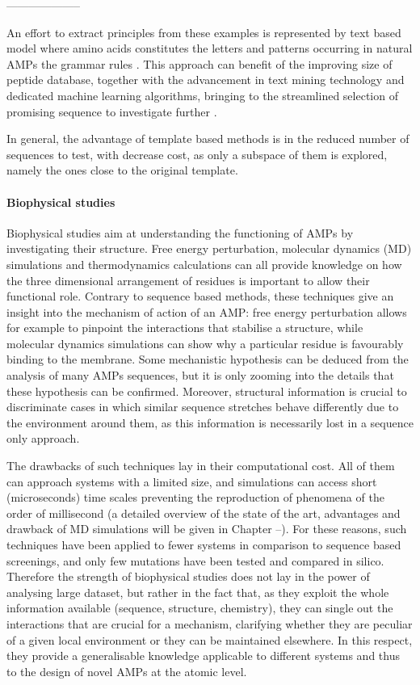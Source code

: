 --------------------




An effort to extract principles from these examples is represented by text based model where amino acids constitutes the letters and patterns occurring in natural AMPs the grammar rules \cite{Loose2006}.
This approach can benefit of the improving size of peptide database, together with the advancement in text mining technology and dedicated machine learning algorithms, bringing to the streamlined selection of promising sequence to investigate further \cite{Cipcigan2018}.

In general, the advantage of template based methods is in the reduced number of sequences to test, with decrease cost, as only a subspace of them is explored, namely the ones close to the original template.


\paragraph{Biophysical studies}
Biophysical studies aim at understanding the functioning of AMPs by investigating their structure. Free energy perturbation, molecular dynamics (MD) simulations and thermodynamics calculations can all provide knowledge on how the three dimensional arrangement of residues is important to allow their functional role.
%
Contrary to sequence based methods, these techniques give an insight into the mechanism of action of an AMP: free energy perturbation allows for example to pinpoint the interactions that stabilise a structure, while molecular dynamics simulations can show why a particular residue is favourably binding to the membrane. Some mechanistic hypothesis can be deduced from the analysis of many AMPs sequences, but it is only zooming into the details that these hypothesis can be confirmed. Moreover, structural information is crucial to discriminate cases in which similar sequence stretches behave differently due to the environment around them, as this information is necessarily lost in a sequence only approach.

The drawbacks of such techniques lay in their computational cost. All of them can approach systems with a limited size, and simulations can access short (microseconds) time scales preventing the reproduction of phenomena of the order of millisecond (a detailed overview of the state of the art, advantages and drawback of MD simulations will be given in Chapter --).
%
For these reasons, such techniques have been applied to fewer systems in comparison to sequence based screenings, and only few mutations have been tested and compared in silico.
%
Therefore the strength of biophysical studies does not lay in the power of analysing large dataset, but rather in the fact that, as they exploit the whole information available (sequence, structure, chemistry), they can single out the interactions that are crucial for a mechanism, clarifying whether they are peculiar of a given local environment or they can be maintained elsewhere. In this respect, they provide a generalisable knowledge applicable to different systems and thus to the design of novel AMPs at the atomic level.

